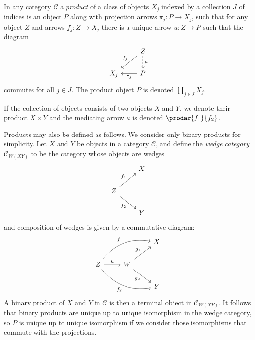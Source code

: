 \documentclass[article, a4paper, 11pt, oneside]{memoir}
\numberwithin{equation}{chapter}
\newcommand{\cat}[1]{\mathcal{#1}}
\newcommand{\catC}{\cat{C}}
\theoremstyle{myexample}
\theoremstyle{myexamplebreak}
\begin{document}
\begin{definition}[Products]
    In any category $\catC$ a \emph{product} of a class of objects $X_j$ indexed by a collection $J$ of indices is an object $P$ along with projection arrows $\pi_j \colon P \to X_j$, such that for any object $Z$ and arrows $f_j \colon Z \to X_j$ there is a unique arrow $u \colon Z \to P$ such that the diagram
    \begin{equation*}
        \begin{tikzcd}
            & Z
                \ar[dl, "f_j", swap]
                \ar[d, "u", dashed]
            \\
            X_j
            & P
                \ar[l, "\pi_j"]
        \end{tikzcd}
    \end{equation*}
    commutes for all $j \in J$. The product object $P$ is denoted $\prod_{j \in J} X_j$.

    If the collection of objects consists of two objects $X$ and $Y$, we denote their product $X \times Y$ and the mediating arrow $u$ is denoted $\prodar{f_1}{f_2}$.
\end{definition}
%
Products may also be defined as follows. We consider only binary products for simplicity. Let $X$ and $Y$ be objects in a category $\catC$, and define the \emph{wedge category} $\catC_{W(XY)}$ to be the category whose objects are wedges
%
\begin{equation*}
    \begin{tikzcd}
        & X
        \\
        Z
            \ar[ur, "f_1"]
            \ar[dr, "f_2", swap]
        \\
        & Y
    \end{tikzcd}
\end{equation*}
%
and composition of wedges is given by a commutative diagram:
%
\begin{equation*}
    \begin{tikzcd}
        && X
        \\
        Z
            \ar[urr, "f_1", bend left]
            \ar[drr, "f_2", bend right, swap]
            \ar[r, "h"]
        & W
            \ar[ur, "g_1"]
            \ar[dr, "g_2", swap]
        \\
        && Y
    \end{tikzcd}
\end{equation*}
%
A binary product of $X$ and $Y$ in $\catC$ is then a terminal object in $\catC_{W(XY)}$. It follows that binary products are unique up to unique isomorphism in the wedge category, so $P$ is unique up to unique isomorphism if we consider those isomorphisms that commute with the projections.
\end{document}
